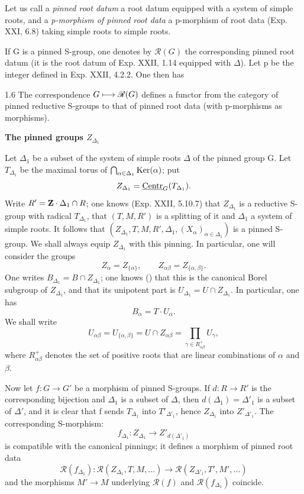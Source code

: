 Let us call a \emph{pinned root datum} a root datum equipped with a system of simple roots, and a \emph{p-morphism of pinned root data} a p-morphism of root data (Exp. XXI, 6.8) taking simple roots to simple roots.

If G is a pinned S-group, one denotes by $\mathscr R(G)$ the corresponding pinned root datum (it is the root datum of Exp. XXII, 1.14 equipped with $\Delta$). Let p be the integer defined in Exp. XXII, 4.2.2. One then has
\begin{scholium}{1.6}\label{XXIII.1.6}
The correspondence $G\longmapsto\mathscr R(G)$ defines a functor from the category of pinned reductive S-groups to that of pinned root data (with p-morphisms as morphisms).
\end{scholium}

\textbf{The pinned groups $Z_{\Delta_1}$}

Let $\Delta_1$ be a subset of the system of simple roots $\Delta$ of the pinned group G. Let $T_{\Delta_1}$ be the maximal torus of $\bigcap_{\alpha\in\Delta_1}\operatorname{Ker}(\alpha)$; put
\[
Z_{\Delta_1}=\underline{\mathrm{Centr}}_G(T_{\Delta_1}).
\]
Write $R'=\mathbf{Z}\cdot\Delta_1\cap R$; one knows (Exp. XXII, 5.10.7) that $Z_{\Delta_1}$ is a reductive S-group with radical $T_{\Delta_1}$, that $(T,M,R')$ is a splitting of it and $\Delta_1$ a system of simple roots. It follows that $(Z_{\Delta_1},T,M,R',\Delta_1,(X_\alpha)_{\alpha\in\Delta_1})$ is a pinned S-group. We shall always equip $Z_{\Delta_1}$ with this pinning. In particular, one will consider the groups
\[
Z_\alpha=Z_{\{\alpha\}},\qquad Z_{\alpha\beta}=Z_{\{\alpha,\beta\}}.
\]
One writes $B_{\Delta_1}=B\cap Z_{\Delta_1}$; one knows (\loccit) that this is the canonical Borel subgroup of $Z_{\Delta_1}$, and that its unipotent part is $U_{\Delta_1}=U\cap Z_{\Delta_1}$. In particular, one has
\[
B_\alpha=T\cdot U_\alpha.
\]
We shall write
\[
U_{\alpha\beta}=U_{\{\alpha,\beta\}}=U\cap Z_{\alpha\beta}=\prod_{\gamma\in R^+_{\alpha\beta}}U_\gamma,
\]
where $R^+_{\alpha\beta}$ denotes the set of positive roots that are linear combinations of $\alpha$ and $\beta$.

Now let $f:G\to G'$ be a morphism of pinned S-groups. If $d:R\to R'$ is the corresponding bijection and $\Delta_1$ is a subset of $\Delta$, then $d(\Delta_1)=\Delta'_1$ is a subset of $\Delta'$, and it is clear that f sends $T_{\Delta_1}$ into $T'_{\Delta'_1}$, hence $Z_{\Delta_1}$ into $Z'_{\Delta'_1}$. The corresponding S-morphism:
\[
f_{\Delta_1}:Z_{\Delta_1}\to Z'_{d(\Delta'_1)}
\]
is compatible with the canonical pinnings; it defines a morphism of pinned root data
\[
\mathscr R(f_{\Delta_1}):\mathscr R(Z_{\Delta_1},T,M,\ldots)\to\mathscr R(Z_{\Delta'_1},T',M',\ldots)
\]
and the morphisms $M'\to M$ underlying $\mathscr R(f)$ and $\mathscr R(f_{\Delta_1})$ coincide.


